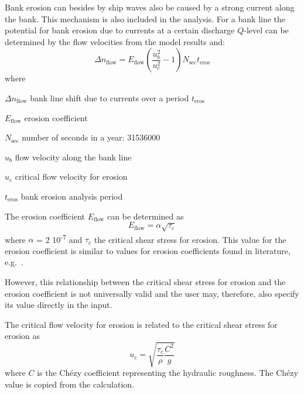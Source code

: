 Bank erosion can besides by ship waves also be caused by a strong current along the bank.
This mechanism is also included in the \dfastbe analysis.
For a bank line the potential for bank erosion due to currents at a certain discharge $Q$-level can be determined by the flow velocities from the model results and:
%
\begin{equation}
\Delta n_\text{flow} = E_\text{flow} \left ( \frac{u_b^2}{u_c^2} - 1 \right ) N_\text{sec} t_\text{eros}
\end{equation}
%
where
%
\begin{symbollist}
\item[$\Delta n_\text{flow}$] bank line shift due to currents over a period $t_\text{eros}$ 
\item[$E_\text{flow}$] erosion coefficient 
\item[$N_\text{sec}$] number of seconds in a year: 31536000 \unitbrackets{-}
\item[$u_b$] flow velocity along the bank line 
\item[$u_c$] critical flow velocity for erosion 
\item[$t_\text{eros}$] bank erosion analysis period 
\end{symbollist}
%
The erosion coefficient $E_\text{flow}$ can be determined as
%
\begin{equation}
E_\text{flow} = \alpha \sqrt{\tau_c}
\end{equation}
%
where $\alpha$ = 2 10\textsuperscript{-7}  and $\tau_c$  the critical shear stress for erosion.
This value for the erosion coefficient is similar to values for erosion coefficients found in literature, e.g.~\citet{Crosato07}.

However, this relationship between the critical shear stress for erosion and the erosion coefficient is not universally valid and the user may, therefore, also specify its value directly in the input.

The critical flow velocity for erosion is related to the critical shear stress for erosion as
%
\begin{equation}
u_c = \sqrt{\frac{\tau_c}{\rho} \frac{C^2}{g}}
\end{equation}
%
where $C$  is the Ch\'ezy coefficient representing the hydraulic roughness.
The Ch\'ezy value is copied from the \dflowfm calculation.


